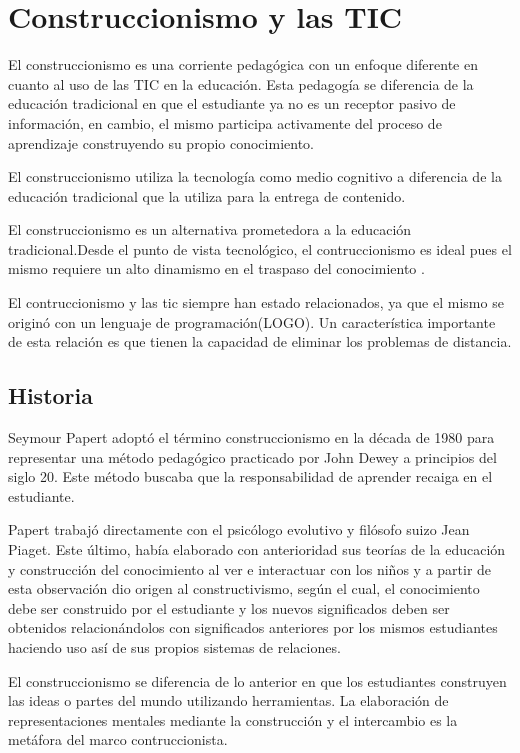 \section{Construccionismo y las TIC}

El construccionismo es una corriente pedagógica con un enfoque diferente en cuanto 
al uso de las TIC en la educación. Esta pedagogía se diferencia de la educación tradicional en 
que el estudiante ya no es un receptor pasivo de información, en cambio, el mismo
participa activamente del proceso de aprendizaje construyendo su propio conocimiento. 

El construccionismo utiliza la tecnología como medio cognitivo  a diferencia de
la educación tradicional que la utiliza para la entrega de contenido. 

El construccionismo es un alternativa prometedora a la educación
tradicional.Desde el punto de vista tecnológico, el contruccionismo es ideal
pues el mismo requiere un alto dinamismo en el traspaso del conocimiento
\cite{sasha:construtivism}. 

El contruccionismo y las \Gls{tic} siempre han estado relacionados, ya que el
mismo se originó con un lenguaje de programación(LOGO)\cite{ict:ttc}. Un
característica importante de esta relación es que tienen la capacidad de
eliminar los problemas de distancia\cite{mariluz:seiousgames}.


\subsection{Historia}

Seymour Papert adoptó el término construccionismo en la década de 1980 para
representar una método pedagógico practicado por John Dewey a principios del
siglo 20. Este método buscaba que la responsabilidad de aprender recaiga en el
estudiante. 

Papert trabajó directamente con el psicólogo evolutivo y filósofo suizo Jean
Piaget. Este último, había elaborado con anterioridad sus teorías de la educación y construcción del
conocimiento al ver e interactuar con los niños y a partir de esta observación
dio origen al constructivismo, según el cual, el conocimiento debe ser construido por
el estudiante y los nuevos significados deben ser obtenidos relacionándolos con
significados anteriores por los mismos estudiantes haciendo uso así de sus
propios sistemas de relaciones.

El construccionismo se diferencia de lo anterior en que los estudiantes
construyen las ideas o partes del mundo utilizando herramientas. La elaboración
de representaciones mentales mediante la construcción y el intercambio es la
metáfora del marco contruccionista. 

